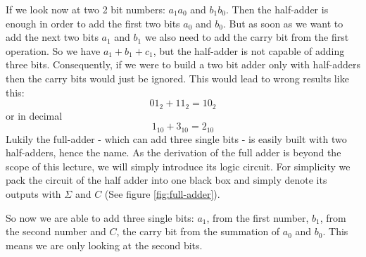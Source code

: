 \documentclass[10pt,a4paper]{article}
\begin{document}
If we look now at two 2 bit numbers: $a_1a_0$ and $b_1b_0$. Then the half-adder is enough in order to add the first two bits $a_0$ and $b_0$. But as soon as we want to add the next two bits $a_1$ and $b_1$ we also need to add the carry bit from the first operation. So we have $a_1+b_1+c_1$, but the half-adder is not capable of adding three bits. Consequently, if we were to build a two bit adder only with half-adders then the carry bits would just be ignored. This would lead to wrong results like this:
\[
01_2 + 11_2 = 10_2
\]
or in decimal
\[
1_{10} + 3_{10} = 2_{10}
\]
Lukily the full-adder - which can add three single bits - is easily built with two half-adders, hence the name. As the derivation of the full adder is beyond the scope of this lecture, we will simply introduce its logic circuit. For simplicity we pack the circuit of the half adder into one black box and simply denote its outputs with $\Sigma$ and $C$ (See figure \ref{fig:full-adder}).

So now we are able to add three single bits: $a_1$, from the first number, $b_1$, from the second number and $C$, the carry bit from the summation of $a_0$ and $b_0$. This means we are only looking at the second bits.
\end{document}
